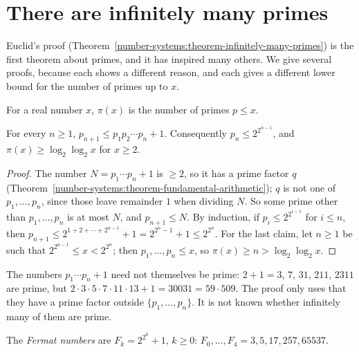 \section{There are infinitely many primes}\label{prime-numbers:section-infinitude}

Euclid's proof (Theorem~\ref{number-systems:theorem-infinitely-many-primes}) is the first theorem about primes, and it has inspired many others. We give several proofs, because each shows a
different reason, and each gives a different lower bound for the number of primes up to $x$.

\begin{definition}\label{prime-numbers:definition-pi}
For a real number $x$, $\pi(x)$ is the number of primes $p \leq x$.
\end{definition}

\begin{proposition}[Euclid]\label{prime-numbers:proposition-euclid}
For every $n \geq 1$, $p_{n+1} \leq p_1p_2 \cdots p_n + 1$. Consequently $p_n \leq 2^{2^{n-1}}$, and $\pi(x) \geq \log_2\log_2 x$ for $x \geq 2$.
\end{proposition}

\begin{proof}
The number $N = p_1 \cdots p_n + 1$ is $\geq 2$, so it has a prime factor $q$ (Theorem~\ref{number-systems:theorem-fundamental-arithmetic}); $q$ is not one of $p_1, \ldots, p_n$, since
those leave remainder $1$ when dividing $N$. So some prime other than $p_1, \ldots, p_n$ is at most $N$, and $p_{n+1} \leq N$. By induction, if $p_i \leq 2^{2^{i-1}}$ for $i \leq n$, then
$p_{n+1} \leq 2^{1 + 2 + \cdots + 2^{n-1}} + 1 = 2^{2^n - 1} + 1 \leq 2^{2^n}$. For the last claim, let $n \geq 1$ be such that $2^{2^{n-1}} \leq x < 2^{2^n}$; then $p_1, \ldots, p_n \leq x$, so
$\pi(x) \geq n > \log_2\log_2 x$.
\end{proof}

\begin{counterexample}\label{prime-numbers:counterexample-euclid-numbers}
The numbers $p_1 \cdots p_n + 1$ need not themselves be prime: $2 + 1 = 3$, $7$, $31$, $211$, $2311$ are prime, but $2 \cdot 3 \cdot 5 \cdot 7 \cdot 11 \cdot 13 + 1 = 30031 = 59 \cdot 509$. The proof
only uses that they have a prime factor outside $\{p_1, \ldots, p_n\}$. It is not known whether infinitely many of them are prime.
\end{counterexample}

\begin{definition}\label{prime-numbers:definition-fermat-numbers}
The \emph{Fermat numbers} are $F_k = 2^{2^k} + 1$, $k \geq 0$: $F_0, \ldots, F_4 = 3, 5, 17, 257, 65537$.
\end{definition}

